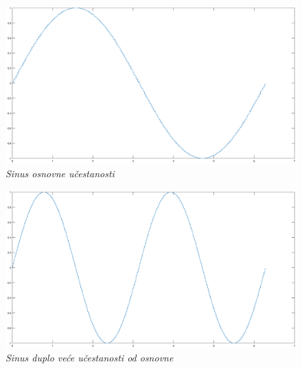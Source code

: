 \documentclass[conference]{IEEEtran}
\begin{document}
\begin{figure}[h!]
	\centering
	\includegraphics[scale=0.16]{./slike/sinus.eps}
	\caption{\textsl{Sinus osnovne učestanosti}}
	\label{slika:sin}
\end{figure}

\begin{figure}[h!]
	\centering
	\includegraphics[scale=0.16]{./slike/sin2.eps}
	\caption{\textsl{Sinus duplo veće učestanosti od osnovne}}
	\label{slika:sin2}
\end{figure}

\end{document}
